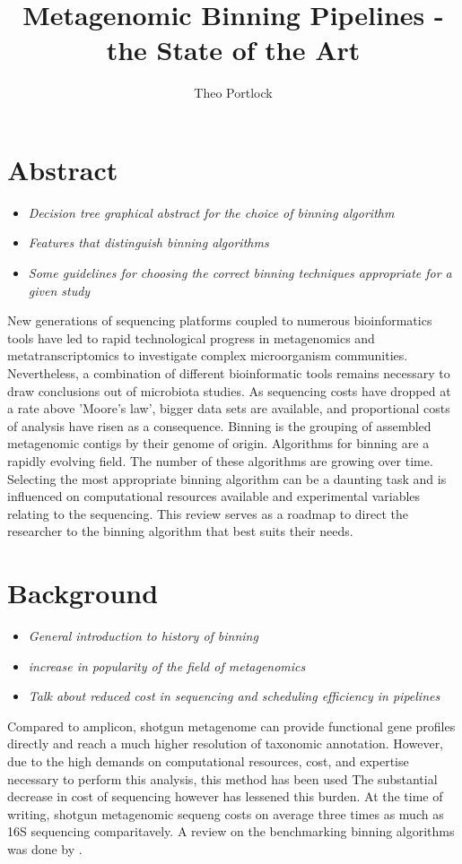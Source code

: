 \documentclass{article}
\title{Metagenomic Binning Pipelines - the State of the Art}
\author{Theo Portlock}
\begin{document}
\maketitle

\section{Abstract}
\begin{itemize}
	\item \emph{Decision tree graphical abstract for the choice of binning algorithm}
	\item \emph{Features that distinguish binning algorithms}
	\item \emph{Some guidelines for choosing the correct binning techniques appropriate for a given study}
\end{itemize}
New generations of sequencing platforms coupled to numerous bioinformatics tools have led to rapid technological progress in metagenomics and metatranscriptomics to investigate complex microorganism communities.
Nevertheless, a combination of different bioinformatic tools remains necessary to draw conclusions out of microbiota studies.
As sequencing costs have dropped at a rate above 'Moore's law', bigger data sets are available, and proportional costs of analysis have risen as a consequence.
Binning is the grouping of assembled metagenomic contigs by their genome of origin.
Algorithms for binning are a rapidly evolving field.
The number of these algorithms are growing over time.
Selecting the most appropriate binning algorithm can be a daunting task and is influenced on computational resources available and experimental variables relating to the sequencing.
This review serves as a roadmap to direct the researcher to the binning algorithm that best suits their needs.

\section{Background}
\begin{itemize}
	\item \emph{General introduction to history of binning}
	\item \emph{increase in popularity of the field of metagenomics}
	\item \emph{Talk about reduced cost in sequencing and scheduling efficiency in pipelines}
\end{itemize}
Compared to amplicon, shotgun metagenome can provide functional gene profiles directly and reach a much higher resolution of taxonomic annotation.
However, due to the high demands on computational resources, cost, and expertise necessary to perform this analysis, this method has been used
The substantial decrease in cost of sequencing however has lessened this burden. 
At the time of writing, shotgun metagenomic sequeng costs on average three times as much as 16S sequencing comparitavely.
A review on the benchmarking binning algorithms was done by .
	
\end{document}
